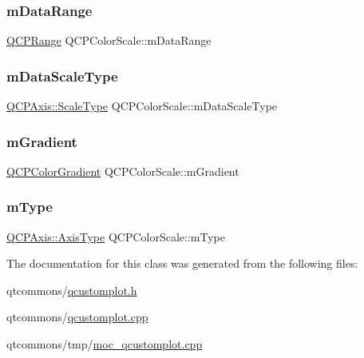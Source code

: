 \subsubsection{\texorpdfstring{mDataRange}{mDataRange}}
{\footnotesize\ttfamily \mbox{\hyperlink{class_q_c_p_range}{Q\+C\+P\+Range}} Q\+C\+P\+Color\+Scale\+::m\+Data\+Range\hspace{0.3cm}{\ttfamily [protected]}}

\mbox{\label{class_q_c_p_color_scale_a2754d6a78736f64a241e333fbd955372}} 
\subsubsection{\texorpdfstring{mDataScaleType}{mDataScaleType}}
{\footnotesize\ttfamily \mbox{\hyperlink{class_q_c_p_axis_a36d8e8658dbaa179bf2aeb973db2d6f0}{Q\+C\+P\+Axis\+::\+Scale\+Type}} Q\+C\+P\+Color\+Scale\+::m\+Data\+Scale\+Type\hspace{0.3cm}{\ttfamily [protected]}}

\mbox{\label{class_q_c_p_color_scale_ae195a385032066b5c46cc3301af58922}} 
\subsubsection{\texorpdfstring{mGradient}{mGradient}}
{\footnotesize\ttfamily \mbox{\hyperlink{class_q_c_p_color_gradient}{Q\+C\+P\+Color\+Gradient}} Q\+C\+P\+Color\+Scale\+::m\+Gradient\hspace{0.3cm}{\ttfamily [protected]}}

\mbox{\label{class_q_c_p_color_scale_a7d47ed4ab76f38e50164e9d77fe33789}} 
\subsubsection{\texorpdfstring{mType}{mType}}
{\footnotesize\ttfamily \mbox{\hyperlink{class_q_c_p_axis_ae2bcc1728b382f10f064612b368bc18a}{Q\+C\+P\+Axis\+::\+Axis\+Type}} Q\+C\+P\+Color\+Scale\+::m\+Type\hspace{0.3cm}{\ttfamily [protected]}}



The documentation for this class was generated from the following files\+:\begin{DoxyCompactItemize}
\item 
qtcommons/\mbox{\hyperlink{qcustomplot_8h}{qcustomplot.\+h}}\item 
qtcommons/\mbox{\hyperlink{qcustomplot_8cpp}{qcustomplot.\+cpp}}\item 
qtcommons/tmp/\mbox{\hyperlink{moc__qcustomplot_8cpp}{moc\+\_\+qcustomplot.\+cpp}}\end{DoxyCompactItemize}
